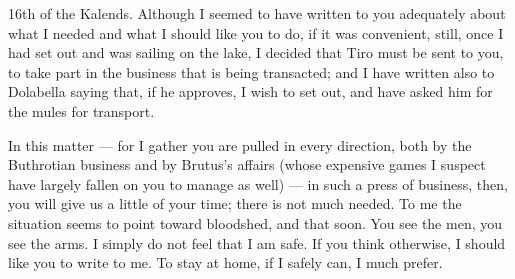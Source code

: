 

 16th of the Kalends. Although I seemed to have written to you adequately about what I needed and what I should like you to do, if it was convenient, still, once I had set out and was sailing on the lake, I decided that Tiro must be sent to you, to take part in the business that is being transacted; and I have written also to Dolabella saying that, if he approves, I wish to set out, and have asked him for the mules for transport.

 In this matter --- for I gather you are pulled in every direction, both by the Buthrotian business and by Brutus's affairs (whose expensive games I suspect have largely fallen on you to manage as well) --- in such a press of business, then, you will give us a little of your time; there is not much needed. To me the situation seems to point toward bloodshed, and that soon. You see the men, you see the arms. I simply do not feel that I am safe. If you think otherwise, I should like you to write to me. To stay at home, if I safely can, I much prefer.
